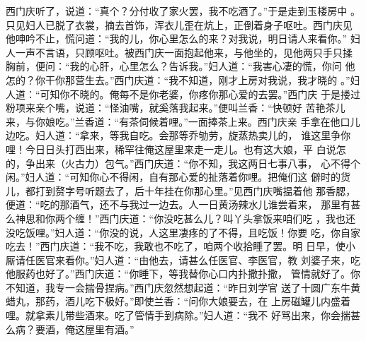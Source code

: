 西门庆听了，说道：“真个？分付收了家火罢，我不吃酒了。”于是走到玉楼房中
。只见妇人已脱了衣裳，摘去首饰，浑衣儿歪在炕上，正倒着身子呕吐。西门庆见
他呻吟不止，慌问道：“我的儿，你心里怎么的来？对我说，明日请人来看你。”
妇人一声不言语，只顾呕吐。被西门庆一面抱起他来，与他坐的，见他两只手只揉
胸前，便问：“我的心肝，心里怎么？告诉我。”妇人道：“我害心凄的慌，你问
他怎的？你干你那营生去。”西门庆道：“我不知道，刚才上房对我说，我才晓的
。”妇人道：“可知你不晓的。俺每不是你老婆，你疼你那心爱的去罢。”西门庆
于是搂过粉项来亲个嘴，说道：“怪油嘴，就奚落我起来。”便叫兰香：“快顿好
苦艳茶儿来，与你娘吃。”兰香道：“有茶伺候着哩。”一面捧茶上来。西门庆亲
手拿在他口儿边吃。妇人道：“拿来，等我自吃。会那等乔劬劳，旋蒸热卖儿的，
谁这里争你哩！今日日头打西出来，稀罕往俺这屋里来走一走儿。也有这大娘，平
白说怎的，争出来（火古力）包气。”西门庆道：“你不知，我这两日七事八事，
心不得个闲。”妇人道：“可知你心不得闲，自有那心爱的扯落着你哩。把俺们这
僻时的货儿，都打到赘字号听题去了，后十年挂在你那心里。”见西门庆嘴揾着他
那香腮，便道：“吃的那酒气，还不与我过一边去。人一日黄汤辣水儿谁尝着来，
那里有甚么神思和你两个缠！”西门庆道：“你没吃甚么儿？叫丫头拿饭来咱们吃
，我也还没吃饭哩。”妇人道：“你没的说，人这里凄疼的了不得，且吃饭！你要
吃，你自家吃去！”西门庆道：“我不吃，我敢也不吃了，咱两个收拾睡了罢。明
日早，使小厮请任医官来看你。”妇人道：“由他去，请甚么任医官、李医官，教
刘婆子来，吃他服药也好了。”西门庆道：“你睡下，等我替你心口内扑撒扑撒，
管情就好了。你不知道，我专一会揣骨捏病。”西门庆忽然想起道：“昨日刘学官
送了十圆广东牛黄蜡丸，那药，酒儿吃下极好。”即使兰香：“问你大娘要去，在
上房磁罐儿内盛着哩。就拿素儿带些酒来。吃了管情手到病除。”妇人道：“我不
好骂出来，你会揣甚么病？要酒，俺这屋里有酒。”

